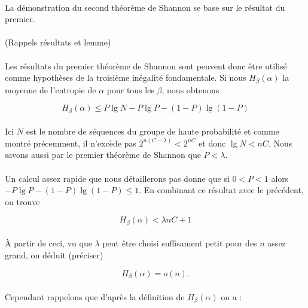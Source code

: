 	\paragraph{}La démonstration du second théorème de Shannon se base sur le résultat du premier. 
	
	\paragraph{}
	(Rappels résultats et lemme)
	
	\paragraph{}
	Les résultats du premier théorème de Shannon sont peuvent donc être utilisé comme hypothèses de la troisième inégalité fondamentale.
	Si nous $H_\beta(\alpha)$ la moyenne de l'entropie de $\alpha$ pour tous les $\beta$, nous obtenons
	
	\[H_\beta(\alpha)\le P\lg N - P\lg P - (1-P)\lg(1-P)\]
	
	\paragraph{}
	Ici $N$ est le nombre de séquences du groupe de haute probabilité et comme montré précemment, il n'excède pas $2^{n(C-\lambda)}<2^{nC}$
	et donc $\lg N<nC$. Nous savons aussi par le premier théorème de Shannon que $P<\lambda$.
	
	\paragraph{}
	Un calcul assez rapide que nous détaillerons pas donne que si $0<P<1$ alors $-P\lg P -(1-P)\lg(1-P)\le 1$. En combinant ce résultat avec le précédent, on trouve
	
	\[H_\beta(\alpha) < \lambda nC + 1\]
	
	\paragraph{}
	À partir de ceci, vu que $\lambda$ peut être choisi suffisament petit pour des $n$ assez grand, on déduit (préciser)
	
	\[H_\beta(\alpha)=o(n).\]
	
	\paragraph{}
	Cependant rappelons que d'après la définition de $H_\beta(\alpha)$ on a :
	
